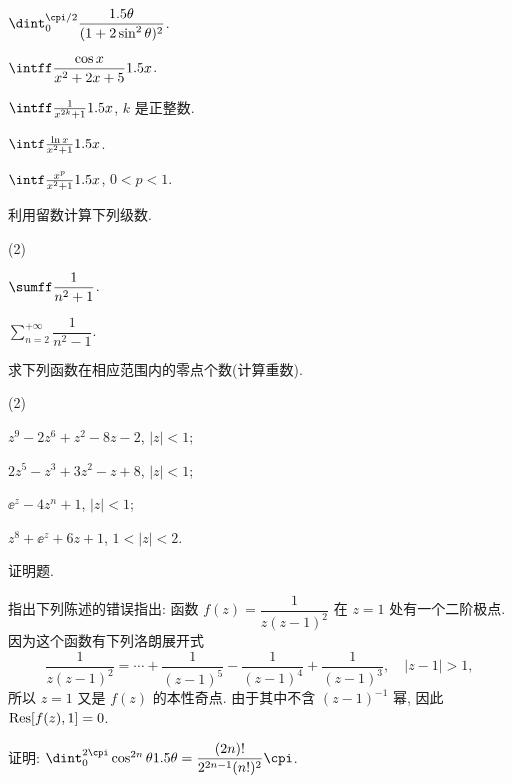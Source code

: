 \begin{homework}
\begin{homework}
\begin{subhomework}
          \item $\dint_0^{\cpi/2}\dfrac{\d \theta}{(1+2\sin^2\theta)^2}$.
          \item $\intff \dfrac{\cos x}{x^2+2x+5}\d x$.
          \item $\intff \frac{1}{x^{2k}+1}\d x$, $k$ 是正整数.
          \item $\intf\frac{\ln x}{x^2+1}\d x$.
          \item $\intf\frac{x^p}{x^2+1}\d x$, $0<p<1$.
        \end{subhomework}
      \item 利用留数计算下列级数.
        \begin{subhomework}(2)
          \item $\sumff \dfrac1{n^2+1}$.
          \item $\displaystyle\sum_{n=2}^{+\infty} \dfrac1{n^2-1}$.
        \end{subhomework}
      \item 求下列函数在相应范围内的零点个数(计算重数).
        \begin{subhomework}(2)
          \item $z^9-2z^6+z^2-8z-2$, $|z|<1$;
          \item $2z^5-z^3+3z^2-z+8$, $|z|<1$;
          \item $\ee^z-4z^n+1$, $|z|<1$;
          \item $z^8+\ee^z+6z+1$, $1<|z|<2$.
        \end{subhomework}
  \end{homework}
  \item 证明题.
  \begin{homework}
    \item 指出下列陈述的错误指出: 函数 $f(z)=\dfrac1{z(z-1)^2}$ 在 $z=1$ 处有一个二阶极点. 因为这个函数有下列洛朗展开式
      \[
        \frac1{z(z-1)^2}=\cdots+\frac1{(z-1)^5}-\frac1{(z-1)^4}+\frac1{(z-1)^3},\quad|z-1|>1,
      \]
      所以 $z=1$ 又是 $f(z)$ 的本性奇点. 由于其中不含 $(z-1)^{-1}$ 幂, 因此 ${\mathrm{Res}}[f(z),1]=0$.
    \item 证明: $\dint_0^{2\cpi}\cos^{2n}\theta\d \theta=\dfrac{(2n)!}{2^{2n-1}(n!)^2}\cpi$.
  \end{homework}
\end{homework}


















